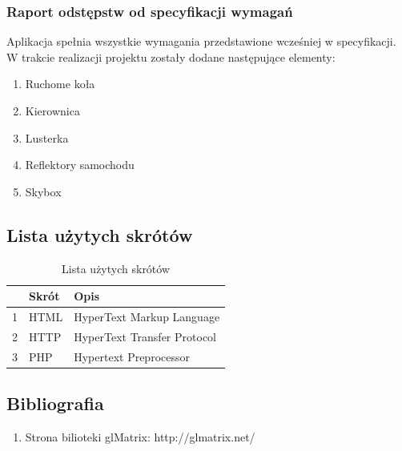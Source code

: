 \documentclass[11pt]{article}
\let\Oldsubsection\subsection
\renewcommand{\subsection}{\FloatBarrier\Oldsubsection}
\let\Oldsubsubsection\subsubsection
\renewcommand{\subsubsection}{\FloatBarrier\Oldsubsubsection}
\begin{document}
\subsubsection{Raport odstępstw od specyfikacji wymagań}
\par
Aplikacja spełnia wszystkie wymagania przedstawione wcześniej w specyfikacji. W trakcie realizacji projektu zostały dodane następujące elementy:
\begin{enumerate}
\item Ruchome koła
\item Kierownica
\item Lusterka
\item Reflektory samochodu
\item Skybox
\end{enumerate}

\subsection{Lista użytych skrótów}

\begin{table}[!h]
\centering
\caption{Lista użytych skrótów}
\label{my-label}
\begin{tabularx}{\textwidth}{|X|X|X|}
\hline
\rowcolor[HTML]{C0C0C0} 
\multicolumn{1}{|l|}{\cellcolor[HTML]{C0C0C0}Lp} & \multicolumn{1}{l|}{\cellcolor[HTML]{C0C0C0}Skrót} & \multicolumn{1}{l|}{\cellcolor[HTML]{C0C0C0}Opis}                               \\ \hline
1                                                & HTML                                                & HyperText Markup Language \\\hline
2                                                & HTTP                                           & HyperText Transfer Protocol \\\hline
3                                                & PHP                                                 & Hypertext Preprocessor \\\hline
\end{tabularx}
\end{table}


\subsection{Bibliografia}
\begin{enumerate}
\item Strona bilioteki glMatrix: http://glmatrix.net/
\end{enumerate}
\end{document}
